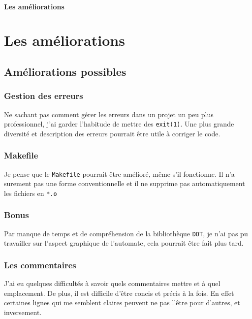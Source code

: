 \renewcommand{\chaptername}{Partie}

\ifsolo
    ~

    \vspace{1cm}

    \begin{center}
        \textbf{\LARGE Les améliorations} \\[1em]
    \end{center}
    \tableofcontents
\else
    \chapter{Les améliorations}

    \minitoc
\fi
\thispagestyle{empty}

\ifsolo \newpage \setcounter{page}{1} \fi


\section{Améliorations possibles}
\subsection{Gestion des erreurs}
Ne sachant pas comment gérer les erreurs dans un projet un peu plus professionnel, j'ai garder l'habitude de mettre des \texttt{exit(1)}. Une plus grande diversité et description des erreurs pourrait être utile à corriger le code.
\subsection{Makefile}
Je pense que le  \texttt{Makefile} pourrait être amélioré, même s'il fonctionne. Il n'a surement pas une forme conventionnelle et il ne supprime pas automatiquement les fichiers en \texttt{*.o}
\subsection{Bonus}
Par manque de temps et de compréhension de la bibliothèque \texttt{DOT}, je n'ai pas pu travailler sur l'aspect graphique de l'automate, cela pourrait être fait plus tard.
\subsection{Les commentaires}
J'ai eu quelques difficultés à savoir quels commentaires mettre et à quel emplacement. De plus, il est difficile d'être concis et précis à la fois. En effet certaines lignes qui me semblent claires peuvent ne pas l'être pour d'autres, et inversement.
